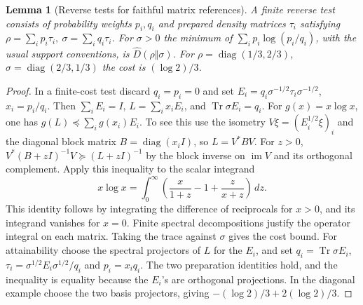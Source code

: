 \documentclass[aps,pra,onecolumn,superscriptaddress,nofootinbib,10pt]{revtex4-2}
\newtheorem{lemma}[theorem]{Lemma}
\theoremstyle{definition}
\theoremstyle{remark}
\newcommand{\tr}{\operatorname{Tr}}
\begin{document}
\begin{lemma}[Reverse tests for faithful matrix references]\label{ob:reversematrix}
A finite reverse test consists of probability weights \(p_i,q_i\)
and prepared density matrices \(\tau_i\) satisfying
\(\rho=\sum_i p_i\tau_i,\ \sigma=\sum_i q_i\tau_i\).
For \(\sigma>0\) the minimum of \(\sum_i p_i\log(p_i/q_i)\), with the
usual support conventions, is \(\widehat D(\rho\Vert\sigma)\).
For \(\rho=\operatorname{diag}(1/3,2/3)\),
\(\sigma=\operatorname{diag}(2/3,1/3)\) the cost is \((\log2)/3\).
\end{lemma}
\begin{proof}
In a finite-cost test discard \(q_i=p_i=0\) and set
\(E_i=q_i\sigma^{-1/2}\tau_i\sigma^{-1/2}\), \(x_i=p_i/q_i\).
Then \(\sum_i E_i=I\), \(L=\sum_i x_i E_i\), and
\(\tr\sigma E_i=q_i\). For \(g(x)=x\log x\), one has
\(g(L)\preceq\sum_i g(x_i)E_i\). To see this use the isometry
\(V\xi=(E_i^{1/2}\xi)_i\) and the diagonal block matrix
\(B=\operatorname{diag}(x_i I)\), so \(L=V^*BV\). For \(z>0\),
\(V^*(B+zI)^{-1}V\succeq(L+zI)^{-1}\) by the block inverse on
\(\operatorname{im}V\) and its orthogonal complement. Apply this
inequality to the scalar integrand
\[
 x\log x=\int_0^\infty\left(\frac{x}{1+z}-1+
                  \frac{z}{x+z}\right)\,dz .
\]
This identity follows by integrating the difference of reciprocals
for \(x>0\), and its integrand vanishes for \(x=0\).
Finite spectral decompositions justify the operator integral on each
matrix. Taking the trace against \(\sigma\) gives the cost bound.
For attainability choose the spectral projectors of \(L\) for the
\(E_i\), and set \(q_i=\tr\sigma E_i\),
\(\tau_i=\sigma^{1/2}E_i\sigma^{1/2}/q_i\) and \(p_i=x_i q_i\).
The two preparation identities hold, and the inequality is equality
because the \(E_i\)'s are orthogonal projections. In the diagonal
example choose the two basis projectors, giving
\(-(\log2)/3+2(\log2)/3\).
\end{proof}
\end{document}
